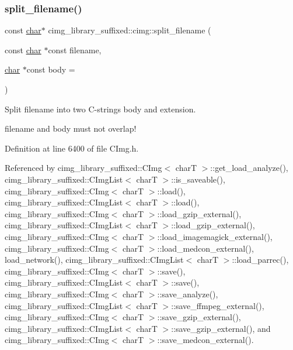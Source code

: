 \subsubsection{\texorpdfstring{split\+\_\+filename()}{split\_filename()}}
{\footnotesize\ttfamily const \hyperlink{classchar}{char}$\ast$ cimg\+\_\+library\+\_\+suffixed\+::cimg\+::split\+\_\+filename (\begin{DoxyParamCaption}\item[{const \hyperlink{classchar}{char} $\ast$const}]{filename,  }\item[{\hyperlink{classchar}{char} $\ast$const}]{body = {} }\end{DoxyParamCaption})\hspace{0.3cm}{\ttfamily [inline]}}



Split filename into two C-\/strings {\ttfamily body} and {\ttfamily extension}. 

filename and body must not overlap! 

Definition at line 6400 of file C\+Img.\+h.



Referenced by cimg\+\_\+library\+\_\+suffixed\+::\+C\+Img$<$ char\+T $>$\+::get\+\_\+load\+\_\+analyze(), cimg\+\_\+library\+\_\+suffixed\+::\+C\+Img\+List$<$ char\+T $>$\+::is\+\_\+saveable(), cimg\+\_\+library\+\_\+suffixed\+::\+C\+Img$<$ char\+T $>$\+::load(), cimg\+\_\+library\+\_\+suffixed\+::\+C\+Img\+List$<$ char\+T $>$\+::load(), cimg\+\_\+library\+\_\+suffixed\+::\+C\+Img$<$ char\+T $>$\+::load\+\_\+gzip\+\_\+external(), cimg\+\_\+library\+\_\+suffixed\+::\+C\+Img\+List$<$ char\+T $>$\+::load\+\_\+gzip\+\_\+external(), cimg\+\_\+library\+\_\+suffixed\+::\+C\+Img$<$ char\+T $>$\+::load\+\_\+imagemagick\+\_\+external(), cimg\+\_\+library\+\_\+suffixed\+::\+C\+Img$<$ char\+T $>$\+::load\+\_\+medcon\+\_\+external(), load\+\_\+network(), cimg\+\_\+library\+\_\+suffixed\+::\+C\+Img\+List$<$ char\+T $>$\+::load\+\_\+parrec(), cimg\+\_\+library\+\_\+suffixed\+::\+C\+Img$<$ char\+T $>$\+::save(), cimg\+\_\+library\+\_\+suffixed\+::\+C\+Img\+List$<$ char\+T $>$\+::save(), cimg\+\_\+library\+\_\+suffixed\+::\+C\+Img$<$ char\+T $>$\+::save\+\_\+analyze(), cimg\+\_\+library\+\_\+suffixed\+::\+C\+Img\+List$<$ char\+T $>$\+::save\+\_\+ffmpeg\+\_\+external(), cimg\+\_\+library\+\_\+suffixed\+::\+C\+Img$<$ char\+T $>$\+::save\+\_\+gzip\+\_\+external(), cimg\+\_\+library\+\_\+suffixed\+::\+C\+Img\+List$<$ char\+T $>$\+::save\+\_\+gzip\+\_\+external(), and cimg\+\_\+library\+\_\+suffixed\+::\+C\+Img$<$ char\+T $>$\+::save\+\_\+medcon\+\_\+external().

